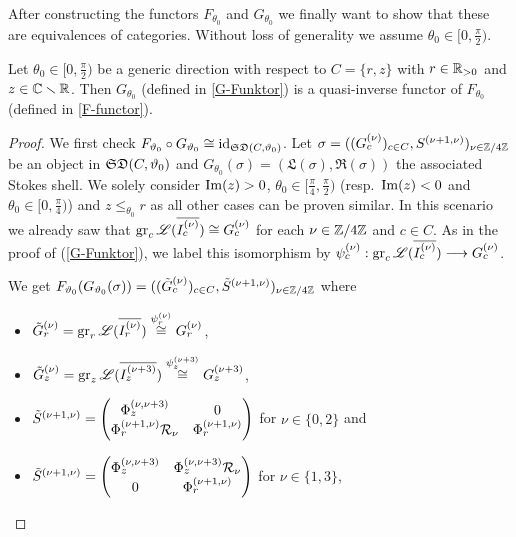 After constructing the functors $F_{\theta_0}$ and $G_{\theta_0}$ we finally want to show that these are  equivalences of categories. Without loss of generality we assume $\theta_0 \in [0,\frac{\pi}{2})$.

\begin{thm} Let $\theta_0 \in [0,\frac{\pi}{2})$ be a generic direction with respect to $C =\{r,z\}$ with $r \in \mathbb{R}_{>0}$ and $z \in \mathbb{C}\smallsetminus \mathbb{R}$. Then $G_{\theta_0}$ (defined in \ref{G-Funktor}) is a quasi-inverse functor of $F_{\theta_0}$ (defined in \ref{F-functor}).
\end{thm}


\begin{proof}
We first check $F_{\vartheta_0} \circ G_{\vartheta_0} \cong \operatorname{id}_{\mathfrak{SD}(C,\vartheta_0)}$. Let $\sigma = ((G_c^{(\nu)})_{c \in C}, S^{(\nu+1,\nu)})_{\nu \in \mathbb{Z}/4\mathbb{Z}}$ be an object in $\mathfrak{SD}(C,\vartheta_0)$ and $G_{\theta_0}(\sigma) = ( \mathfrak{L}(\sigma), \mathfrak{R}(\sigma))$ the associated Stokes shell. We solely consider $\operatorname{Im}(z) >0$, $\theta_0 \in [\frac{\pi}{4}, \frac{\pi}{2})$ (resp.\ $\operatorname{Im}(z) <0$ and $\theta_0 \in [0, \frac{\pi}{4})$) and $z\leq_{\theta_0}r$ as all other cases can be proven similar. In this scenario we already saw that $\operatorname{gr}_c\mathscr{L}(\overline{I_c^{(\nu)}}) \cong G_c^{(\nu)}$ for each $\nu \in \mathbb{Z}/4\mathbb{Z}$ and $c\in C$. As in the proof of (\ref{G-Funktor}), we label this isomorphism by $\psi_c^{(\nu)} : \operatorname{gr}_c\mathscr{L}(\overline{I_c^{(\nu)}}) \longrightarrow G_c^{(\nu)}$. 

We get $F_{\vartheta_0}(G_{\vartheta_0}(\sigma)) = ((\tilde{G}_c^{(\nu)})_{c \in C}, \tilde{S}^{(\nu+1,\nu)})_{\nu \in \mathbb{Z}/4\mathbb{Z}}$ where 

\begin{itemize}
    \item $\tilde{G}_r^{(\nu)} = \operatorname{gr}_r\mathscr{L}(\overline{I_r^{(\nu)}}) \overset{\psi_r^{(\nu)}}{\cong} G_r^{(\nu)}$,
    \item $\tilde{G}_z^{(\nu)} = \operatorname{gr}_z\mathscr{L}(\overline{I_z^{(\nu+3)}}) \overset{\psi_z^{(\nu+3)}}{\cong} G_z^{(\nu+3)}$, 
    \item $\tilde{S}^{(\nu+1,\nu)} =
        \begin{pmatrix}
            \Phi^{(\nu,\nu+3)}_z & 0\\
             \Phi_r^{(\nu+1,\nu)} \mathcal{R}_{\nu} & \Phi_r^{(\nu+1,\nu)}
        \end{pmatrix}$ for $\nu \in \{0,2\}$ and
    \item $\tilde{S}^{(\nu+1,\nu)} = \begin{pmatrix}
            \Phi^{(\nu,\nu+3)}_z & \Phi_z^{(\nu,\nu+3)} \mathcal{R}_\nu\\
            0 & \Phi_r^{(\nu+1,\nu)}
        \end{pmatrix}$ for $\nu \in \{1,3\}$,
\end{itemize}



\end{proof}

